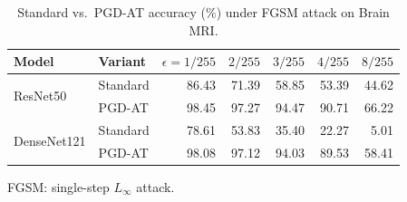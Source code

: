 \begin{table}[htbp]
  \centering
  \caption{Standard vs.\ PGD-AT accuracy (\%) under FGSM attack on Brain MRI.}
  \label{tab:pgd_at_fgsm}
  \begin{tabular}{llrrrrr}
    \toprule
    Model & Variant & $\epsilon=1/255$ & $2/255$ & $3/255$ & $4/255$ & $8/255$ \\
    \midrule
    \multirow{2}{*}{ResNet50}
      & Standard & 86.43 & 71.39 & 58.85 & 53.39 & 44.62 \\
      & PGD-AT   & 98.45 & 97.27 & 94.47 & 90.71 & 66.22 \\
    \midrule
    \multirow{2}{*}{DenseNet121}
      & Standard & 78.61 & 53.83 & 35.40 & 22.27 &  5.01 \\
      & PGD-AT   & 98.08 & 97.12 & 94.03 & 89.53 & 58.41 \\
    \bottomrule
  \end{tabular}
  \vspace{0.25em}
  \begin{minipage}{0.92\linewidth}
    \footnotesize
    FGSM: single-step $L_\infty$ attack.
  \end{minipage}
\end{table}
